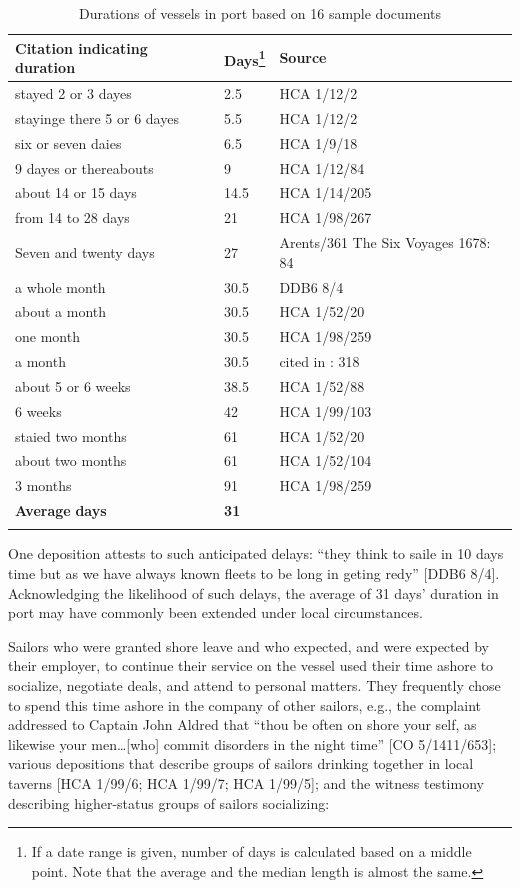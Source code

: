 \begin{table}[b]
\caption{\label{tab:key:4.4} Durations of vessels in port based on 16 sample documents}

\begin{tabularx}{\textwidth}{Qll}
\lsptoprule
\textbf{Citation} \textbf{indicating} \textbf{duration} & \textbf{Days}\footnote{If a date range is given, number of days is calculated based on a middle point. Note that the average and the median length is almost the same.} & \textbf{Source}\\
\midrule
 stayed 2 or 3 dayes & 2.5 & HCA 1/12/2\\
stayinge there 5 or 6 dayes & 5.5 & HCA 1/12/2\\
six or seven daies & 6.5 & HCA 1/9/18\\
9 dayes or thereabouts & 9 & HCA 1/12/84\\
about 14 or 15 days & 14.5 & HCA 1/14/205\\
from 14 to 28 days & 21 & HCA 1/98/267\\
Seven and twenty days & 27 & Arents/361 The Six  {Voyages 1678}: 84\\
a whole month & 30.5 & DDB6 8/4\\
about a month & 30.5 & HCA 1/52/20\\
one month & 30.5 & HCA 1/98/259\\
a month & 30.5 & cited in \citealt{Bicheno2012}: 318\\
about 5 or 6 weeks & 38.5 & HCA 1/52/88\\
6 weeks & 42 & HCA 1/99/103\\
staied two months & 61 & HCA 1/52/20\\
about two months & 61 & HCA 1/52/104\\
3 months & 91 & HCA 1/98/259\\
\midrule 
 \textbf{Average} \textbf{days} & \textbf{31} & \\
\lspbottomrule
\end{tabularx} 
\end{table}

One deposition attests to such anticipated delays: “they think to saile in 10 days time but as we have always known fleets to be long in geting redy” [DDB6 8/4]. Acknowledging the likelihood of such delays, the average of 31 days’ duration in port may have commonly been extended under local circumstances.

Sailors who were granted shore leave and who expected, and were expected by their employer, to continue their service on the vessel used their time ashore to socialize, negotiate deals, and attend to personal matters. They frequently chose to spend this time ashore in the company of other sailors, e.g., the complaint addressed to Captain John Aldred that “thou be often on shore your self, as likewise your men…[who] commit disorders in the night time” [CO 5/1411/653]; various depositions that describe groups of sailors drinking together in local taverns [HCA 1/99/6; HCA 1/99/7; HCA 1/99/5]; and the witness testimony describing higher-status groups of sailors socializing:

